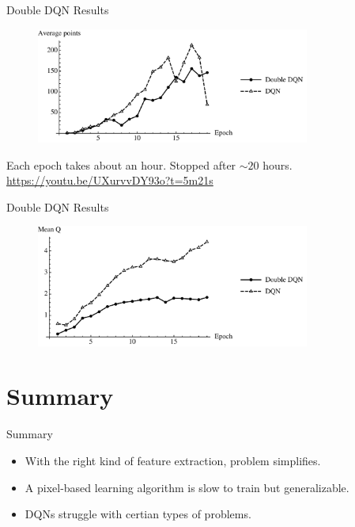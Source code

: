 \documentclass{beamer}
\begin{document}
\begin{frame}{Double DQN Results}
  \begin{figure}[H]
    \centering
    \includegraphics[width=90mm]{dqn_rewardper.pdf}
  \end{figure}
  Each epoch takes about an hour. Stopped after $\sim 20$ hours.\\
  \vspace{12pt}
  \url{https://youtu.be/UXurvvDY93o?t=5m21s}
\end{frame}

\begin{frame}{Double DQN Results}
  \begin{figure}[H]
    \centering
    \includegraphics[width=90mm]{dqn_meanq.pdf}
  \end{figure}
\end{frame}


\section*{Summary}

\begin{frame}{Summary}
  \begin{itemize}
  \item
    With the right kind of feature extraction, problem simplifies.
  \item
    A pixel-based learning algorithm is slow to train but generalizable.
  \item
    DQNs struggle with certian types of problems.
  \end{itemize}
  
\end{frame}
\end{document}
